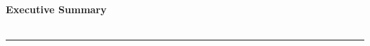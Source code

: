 \clearpage
\thispagestyle{empty} 

\begin{center}
	\vspace*{1.5cm}
	{\large \textbf{Executive Summary}} \\
	\vspace{0.3cm}
	{\large \textbf{}} \\
	\vspace{1cm}
	\rule{\linewidth}{0.5mm}
	\vspace{1cm}
\end{center}






\clearpage